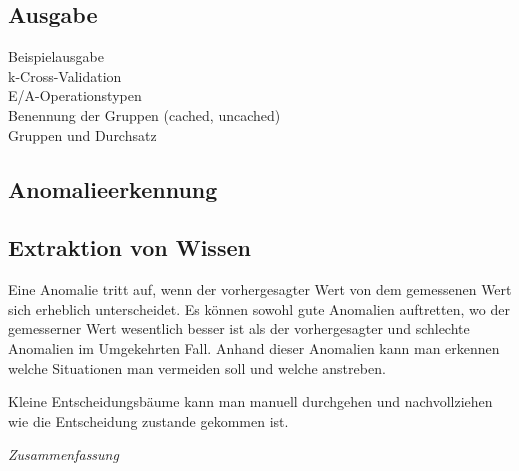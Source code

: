 \subsection{Ausgabe}
Beispielausgabe\\
k-Cross-Validation\\
E/A-Operationstypen\\
Benennung der Gruppen (cached, uncached)\\
Gruppen und Durchsatz

\subsection{Anomalieerkennung}

\subsection{Extraktion von Wissen}
Eine Anomalie tritt auf, wenn der vorhergesagter Wert von dem gemessenen Wert sich erheblich unterscheidet.
Es können sowohl gute Anomalien auftretten, wo der gemesserner Wert wesentlich besser ist als der vorhergesagter und schlechte Anomalien im Umgekehrten Fall.
Anhand dieser Anomalien kann man erkennen welche Situationen man vermeiden soll und welche anstreben.

Kleine Entscheidungsbäume kann man manuell durchgehen und nachvollziehen wie die Entscheidung zustande gekommen ist.

\textit{Zusammenfassung}
